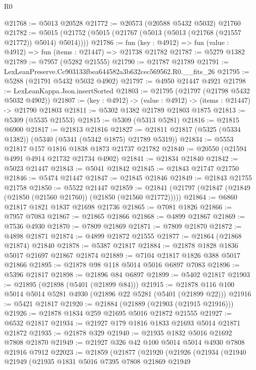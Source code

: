 \begin{lexlean}{R0}
\begin{coremodule}
@21768 := @5013 @20528
@21772 := @20573 (@20588 @5432 @5032) @21760
@21782 := @5015 (@21752 (@5015 (@21767 (@5013 (@5013 (@21768 (@21557 @21772)) @5014) @5014))))
@21786 := fun (key : @4912) => fun (value : @4912) => fun (items : @21447) => @21738 @21782
@21787 := @5279 @1382
@21789 := @7957 (@5282 @21555)
@21790 := @21787 @21789
@21791 := LexLeanPreserve.Cc903133fbea644582a3b632cec569562.R0.__fits_26
@21795 := @5288 (@21791 @5432 @5032 @4902)
@21797 := @4950 @21447 @4921
@21798 := LexLeanKappa.Json.insertSorted
@21803 := @21795 (@21797 (@21798 @5432 @5032 @4902))
@21807 := (key : @4912) -> (value : @4912) -> (items : @21447) -> @21790 @21803
@21811 := @5302 @1382 @21789 @21803 @1875
@21813 := @5309 (@5535 @21553)
@21815 := @5309 (@5313 @5281)
@21816 := @21815 @6900
@21817 := @21813 @21816
@21827 := @21811 @21817 (@5325 (@5334 @1382)) (@5340 (@5341 (@5342 @1875) @21789 @5319))
@21834 := @5553 @21817 @157 @1816 @1838 @1873 @21737 @21782
@21840 := @20550 (@21594 @4991 @4914 @21732 @21734 @4902)
@21841 := @21834 @21840
@21842 := @5023 @21447
@21843 := @5041 @21842
@21845 := @21843 @21747 @21750
@21846 := @5474 @21447
@21847 := @21845 @21846
@21849 := @21843 @21755 @21758
@21850 := @5522 @21447
@21859 := @21841 (@21797 (@21847 (@21849 (@21850 (@21560 @21760)) (@21850 (@21560 @21772)))))
@21864 := @6860 @21817 @1821 @1837 @21698 @21736
@21865 := @7081 @1826
@21866 := @7957 @7083
@21867 := @21865 @21866
@21868 := @4899 @21867
@21869 := @7536 @4930
@21870 := @7809 @21869
@21871 := @7809 @21870
@21872 := @4898 @21871
@21874 := @4899 @21872 @21555
@21877 := @21864 (@21868 @21874) @21840
@21878 := @5387 @21817
@21884 := @21878 @1828 @1836 @5017 @21697 @21867 @21874
@21889 := @7104 @21817 @1826 @388 @5017 @21866
@21895 := @21878 @98 @118 @5014 @5016 @6897 @7083
@21896 := @5396 @21817
@21898 := @21896 @84 @6897
@21899 := @5402 @21817
@21903 := @21895 (@21898 (@5401 (@21899 @84)))
@21915 := @21878 @116 @100 @5014 @5014 @5281 @4930 (@21896 @22 @5281 (@5401 (@21899 @22)))
@21916 := @5421 @21817
@21920 := @21884 (@21889 (@21903 (@21915 @21916)))
@21926 := @21878 @1834 @259 @21695 @5016 @21872 @21555
@21927 := @6532 @21817
@21934 := @21927 @179 @1816 @1833 @21693 @5014 @21871 @21872
@21935 := @21878 @329
@21940 := @21935 @1832 @5016 @21692 @7808 @21870
@21949 := @21927 @326 @42 @100 @5014 @5014 @4930 @7808 @21916 @7912
@22023 := @21859
    (@21877
      (@21920
        (@21926
          (@21934
            (@21940
              @21949
              (@21935
                @1831
                @5016
                @7395
                @7808
                @21869
                @21949

\end{coremodule}
\end{lexlean}

